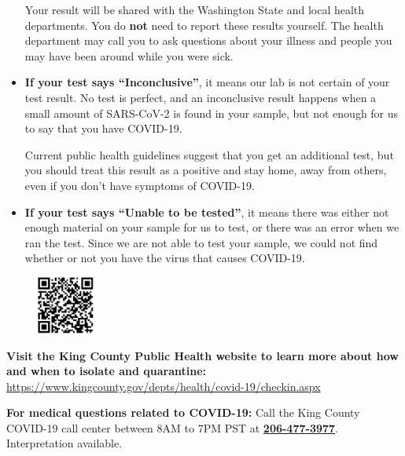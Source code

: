 \documentclass[10pt]{article}
\begin{document}
\begin{itemize}
  Your result will be shared with the Washington State and local health
  departments. You do \textbf{not} need to report these results yourself. The
  health department may call you to ask questions about your illness and people
  you may have been around while you were sick.

\item

  \textbf{If your test says ``Inconclusive''}, it means our lab is not certain
  of your test result. No test is perfect, and an inconclusive result happens
  when a small amount of SARS-CoV-2 is found in your sample, but not enough for
  us to say that you have COVID-19.

  Current public health guidelines suggest that you get an additional test, but
  you should treat this result as a positive and stay home, away from others,
  even if you don’t have symptoms of COVID-19.

\item

  \textbf{If your test says ``Unable to be tested''}, it means there was either
  not enough material on your sample for us to test, or there was an error when
  we ran the test. Since we are not able to test your sample, we could not find
  whether or not you have the virus that causes COVID-19.

\end{itemize}

\bigskip

\begin{figure}
    \begin{flushright}\includegraphics[height=0.75in,trim=0 0 0 0]{king_county_covid19_qr}
    \end{flushright}
\end{figure}

\textbf{Visit the King County Public Health website to learn more about how and when to isolate and quarantine:\\}
\href{https://www.kingcounty.gov/depts/health/covid-19/checkin.aspx}{ https://www.kingcounty.gov/depts/health/covid-19/checkin.aspx}

\textbf{For medical questions related to COVID-19:}
Call the King County COVID-19 call center between 8AM to 7PM PST at \textbf{\href{tel:+1-206-477-3977}{206-477-3977}}.
Interpretation available.
\end{document}
